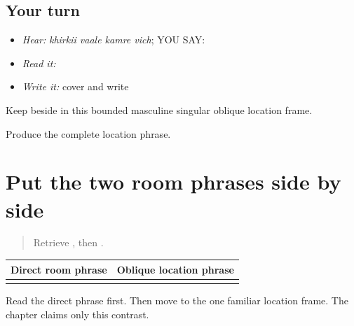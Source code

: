 \subsection*{Your turn}
\begin{itemize}
\raggedright
  \item \emph{Hear:} \emph{khirkii vaale kamre vich}; YOU SAY: \textbf{   }
  \item \emph{Read it:} \textbf{   }
  \item \emph{Write it:} cover and write \textbf{}
\end{itemize}

\begin{grammarlens}[title={Grammar Lens}]
Keep \textbf{} beside \textbf{ } in this bounded masculine singular oblique location frame.
\end{grammarlens}

\begin{tcolorbox}[breakable,colback=teal!4,colframe=teal!35!black,title={Before you move on}]
Produce the complete location phrase.
\end{tcolorbox}
\section[\texorpdfstring{\pa{ਖਿੜਕੀ} \pa{ਵਾਲਾ} \pa{ਕਮਰਾ} … (khirkii vaalaa …)}{ਖਿੜਕੀ ਵਾਲਾ ਕਮਰਾ … (khirkii vaalaa …)}]{Put the two room phrases side by side}

\label{lesson:PA-C195-direct-oblique-contrast}



\begin{quote}
Retrieve \textbf{}, then \textbf{}.
\end{quote}

\begin{grammarlens}[title={Grammar Lens}]
\noindent
\begin{tabularx}{\linewidth}{@{}>{\raggedright\arraybackslash}X>{\raggedright\arraybackslash}X@{}}
\toprule
\textbf{Direct room phrase} & \textbf{Oblique location phrase} \\
\midrule
\textbf{\pa{ਖਿੜਕੀ} \pa{ਵਾਲਾ} \pa{ਕਮਰਾ}} & \textbf{\pa{ਖਿੜਕੀ} \pa{ਵਾਲੇ} \pa{ਕਮਰੇ} \pa{ਵਿੱਚ}} \\
\bottomrule
\end{tabularx}

Read the direct phrase first. Then move to the one familiar location frame. The chapter claims only this contrast.
\end{grammarlens}

